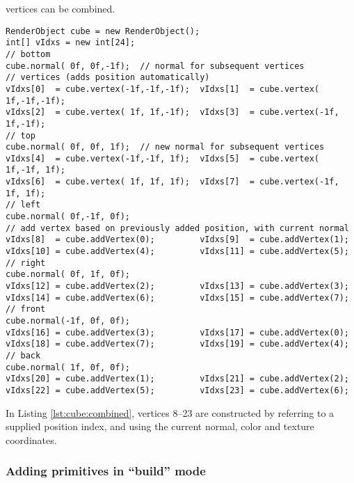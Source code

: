 \documentclass{article}
\begin{document}
vertices can be combined.
\begin{lstlisting}[caption={Combining vertex construction methods},label=lst:cube:combined]
RenderObject cube = new RenderObject();
int[] vIdxs = new int[24];
// bottom
cube.normal( 0f, 0f,-1f);  // normal for subsequent vertices
// vertices (adds position automatically)
vIdxs[0]  = cube.vertex(-1f,-1f,-1f);  vIdxs[1]  = cube.vertex( 1f,-1f,-1f);
vIdxs[2]  = cube.vertex( 1f, 1f,-1f);  vIdxs[3]  = cube.vertex(-1f, 1f,-1f);
// top
cube.normal( 0f, 0f, 1f);  // new normal for subsequent vertices
vIdxs[4]  = cube.vertex(-1f,-1f, 1f);  vIdxs[5]  = cube.vertex( 1f,-1f, 1f);
vIdxs[6]  = cube.vertex( 1f, 1f, 1f);  vIdxs[7]  = cube.vertex(-1f, 1f, 1f);
// left
cube.normal( 0f,-1f, 0f);
// add vertex based on previously added position, with current normal
vIdxs[8]  = cube.addVertex(0);         vIdxs[9]  = cube.addVertex(1);
vIdxs[10] = cube.addVertex(4);         vIdxs[11] = cube.addVertex(5);
// right
cube.normal( 0f, 1f, 0f);
vIdxs[12] = cube.addVertex(2);         vIdxs[13] = cube.addVertex(3);
vIdxs[14] = cube.addVertex(6);         vIdxs[15] = cube.addVertex(7);
// front
cube.normal(-1f, 0f, 0f);
vIdxs[16] = cube.addVertex(3);         vIdxs[17] = cube.addVertex(0);
vIdxs[18] = cube.addVertex(7);         vIdxs[19] = cube.addVertex(4);
// back
cube.normal( 1f, 0f, 0f);
vIdxs[20] = cube.addVertex(1);         vIdxs[21] = cube.addVertex(2);
vIdxs[22] = cube.addVertex(5);         vIdxs[23] = cube.addVertex(6);
\end{lstlisting}
In Listing \ref{lst:cube:combined}, vertices 8--23 are constructed by referring to a supplied
position index, and using the current normal, color and texture coordinates.

\subsubsection{Adding primitives in ``build'' mode}
\end{document}
